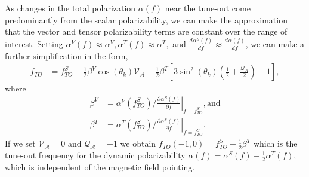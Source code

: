 \documentclass{article}
\newcommand{\pderivn}[3][{}]{
    \frac{\partial^{#1} #2}{\partial #3^{#1}}
}
\newcommand{\derivn}[3][{}]{
    \frac{d^{#1} #2}{d #3^{#1}}
}
\begin{document}
As changes in the total polarization \(\alpha(f)\) near the tune-out come predominantly from the scalar polarizability, we can make the approximation that the vector and tensor polarizability terms are constant over the range of interest. Setting \(\alpha^V(f)\approx\alpha^V, \alpha^T(f)\approx\alpha^T,\) and \(\derivn{\alpha^S(f)}{f}{{}} \approx \derivn{\alpha(f)}{f}{{}} \),
we can make a further simplification in the form, 
 \begin{align}
    f_{TO} &= 
    f^{S}_{TO}
    +\frac{1}{2}\beta^V  \cos \left( \theta_k \right) \mathcal{V_{A}}
    - \frac{1}{2}\beta^T  \left[3 \sin^2\left( \theta_k \right) \left(\frac{1}{2} +  \frac{\mathcal{Q_{A}}}{2}\right) -1 \right], \label{eqn:tune_out_eq} 
\end{align}
where
 \begin{align}
  \beta^V &= \alpha^V(f^{S}_{TO}) \bigg/ \left. \pderivn{\alpha^S(f)}{f} \right|_{f=f^{S}_{TO}} \mathrm{, and}\\
  \beta^T &= \alpha^T(f^{S}_{TO}) \bigg/ \left. \pderivn{\alpha^S(f)}{f} \right|_{f=f^{S}_{TO}} .
 \end{align}
If we set \(\mathcal{V_{A}}=0\) and \(\mathcal{Q_{A}}=-1\) we obtain \(f_{TO}(-1,0) = f^{S}_{TO} + \frac{1}{2} \beta^T\) which is the tune-out frequency for the dynamic polarizability \(\alpha(f) = \alpha^S(f) - \frac{1}{2}  \alpha^T(f)\), which is independent of the magnetic field pointing.
\end{document}

